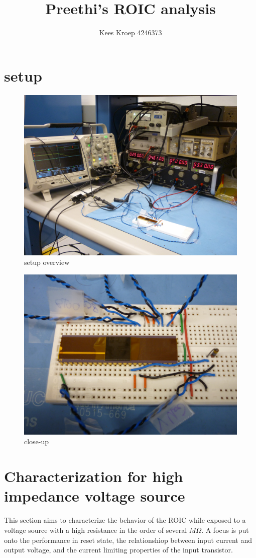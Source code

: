 \documentclass{article}
\title{Preethi's ROIC analysis}
\author{Kees Kroep 4246373}
\begin{document}
  \maketitle

\section{setup}\label{sec:setup}



\begin{figure}[h]
	\centering
	\includegraphics[width=0.6\linewidth]{fig/P1010158.JPG}
	\caption{setup overview}
	\label{fig:setup_overview}
\end{figure}

\begin{figure}[h]
	\centering
	\includegraphics[width=0.6\linewidth]{fig/P1010159.JPG}
	\caption{close-up}
	\label{fig:close-up}
\end{figure}

\clearpage

\section{Characterization for high impedance voltage source}
This section aims to characterize the behavior of the ROIC while exposed to a voltage source with a high resistance in the order of several $M\Omega$. A focus is put onto the performance in reset state, the relationshiop between input current and output voltage, and the current limiting properties of the input transistor.
\end{document}
